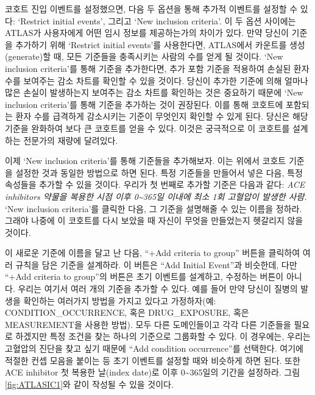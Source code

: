 \documentclass[11pt]{book}
\theoremstyle{definition}
\theoremstyle{definition}
\theoremstyle{definition}
\theoremstyle{remark}
\begin{document}
코호트 진입 이벤트를 설정했으면, 다음 두 옵션을 통해 추가적 이벤트를
설정할 수 있다: `Restrict initial events', 그리고 `New inclusion
criteria'. 이 두 옵션 사이에는 ATLAS가 사용자에게 어떤 임시 정보를
제공하는가의 차이가 있다. 만약 당신이 기준을 추가하기 위해 `Restrict
initial events'를 사용한다면, ATLAS에서 카운트를 생성(generate)할 때,
모든 기준들을 충족시키는 사람의 수를 얻게 될 것이다. `New inclusion
criteria'를 통해 기준을 추가한다면, 추가 포함 기준을 적용하여 손실된
환자 수를 보여주는 감소 차트를 확인할 수 있을 것이다. 당신이 추가한
기준에 의해 얼마나 많은 손실이 발생하는지 보여주는 감소 차트를 확인하는
것은 중요하기 때문에 `New inclusion criteria'를 통해 기준을 추가하는
것이 권장된다. 이를 통해 코호트에 포함되는 환자 수를 급격하게 감소시키는
기준이 무엇인지 확인할 수 있게 된다. 당신은 해당 기준을 완화하여 보다 큰
코호트를 얻을 수 있다. 이것은 궁극적으로 이 코호트를 설계하는 전문가의
재량에 달려있다.

이제 `New inclusion criteria'를 통해 기준들을 추가해보자. 이는 위에서
코호트 기준을 설정한 것과 동일한 방법으로 하면 된다. 특정 기준들을
만들어서 넣은 다음, 특정 속성들을 추가할 수 있을 것이다. 우리가 첫
번째로 추가할 기준은 다음과 같다: \emph{ACE inhibitors 약물을 복용한
시점 이후 0\textasciitilde{}365일 이내에 최소 1회 고혈압이 발생한 사람.}
`New inclusion criteria'를 클릭한 다음, 그 기준을 설명해줄 수 있는
이름을 정하라. 그래야 나중에 이 코호트를 다시 보았을 때 자신이 무엇을
만들었는지 헷갈리지 않을 것이다.

이 새로운 기준에 이름을 달고 난 다음, ``+Add criteria to group'' 버튼을
클릭하여 여러 규칙을 담은 기준을 설계하라. 이 버튼은 ``Add Initial
Event''과 비슷한데, 다만 ``+Add criteria to group''의 버튼은 초기
이벤트를 설계하고, 수정하는 버튼이 아니다. 우리는 여기서 여러 개의
기준을 추가할 수 있다. 예를 들어 만약 당신이 질병의 발생을 확인하는
여러가지 방법을 가지고 있다고 가정하자(예: CONDITION\_OCCURRENCE, 혹은
DRUG\_EXPOSURE, 혹은 MEASUREMENT을 사용한 방법). 모두 다른 도메인들이고
각각 다른 기준들을 필요로 하겠지만 특정 조건을 찾는 하나의 기준으로
그룹화할 수 있다. 이 경우에는, 우리는 고혈압의 진단을 찾고 싶기 때문에
``Add condition occurrence''를 선택한다. 여기에 적절한 컨셉 모음을
붙이는 등 초기 이벤트를 설정할 때와 비슷하게 하면 된다. 또한 ACE
inhibitor 첫 복용한 날(index date)로 이후 0\textasciitilde{}365일의
기간을 설정하라. 그림 \ref{fig:ATLASIC1}와 같이 작성될 수 있을 것이다.
\end{document}
